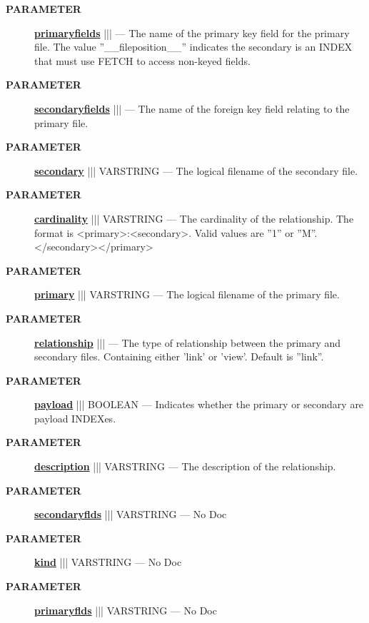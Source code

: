 \par
\begin{description}
\item [\colorbox{tagtype}{\color{white} \textbf{\textsf{PARAMETER}}}] \textbf{\underline{primaryfields}} |||  --- The name of the primary key field for the primary file. The value ''\_\_fileposition\_\_'' indicates the secondary is an INDEX that must use FETCH to access non-keyed fields.
\item [\colorbox{tagtype}{\color{white} \textbf{\textsf{PARAMETER}}}] \textbf{\underline{secondaryfields}} |||  --- The name of the foreign key field relating to the primary file.
\item [\colorbox{tagtype}{\color{white} \textbf{\textsf{PARAMETER}}}] \textbf{\underline{secondary}} ||| VARSTRING --- The logical filename of the secondary file.
\item [\colorbox{tagtype}{\color{white} \textbf{\textsf{PARAMETER}}}] \textbf{\underline{cardinality}} ||| VARSTRING --- The cardinality of the relationship. The format is <primary>:<secondary>. Valid values are ''1'' or ''M''.</secondary></primary>
\item [\colorbox{tagtype}{\color{white} \textbf{\textsf{PARAMETER}}}] \textbf{\underline{primary}} ||| VARSTRING --- The logical filename of the primary file.
\item [\colorbox{tagtype}{\color{white} \textbf{\textsf{PARAMETER}}}] \textbf{\underline{relationship}} |||  --- The type of relationship between the primary and secondary files. Containing either 'link' or 'view'. Default is ''link''.
\item [\colorbox{tagtype}{\color{white} \textbf{\textsf{PARAMETER}}}] \textbf{\underline{payload}} ||| BOOLEAN --- Indicates whether the primary or secondary are payload INDEXes.
\item [\colorbox{tagtype}{\color{white} \textbf{\textsf{PARAMETER}}}] \textbf{\underline{description}} ||| VARSTRING --- The description of the relationship.
\item [\colorbox{tagtype}{\color{white} \textbf{\textsf{PARAMETER}}}] \textbf{\underline{secondaryflds}} ||| VARSTRING --- No Doc
\item [\colorbox{tagtype}{\color{white} \textbf{\textsf{PARAMETER}}}] \textbf{\underline{kind}} ||| VARSTRING --- No Doc
\item [\colorbox{tagtype}{\color{white} \textbf{\textsf{PARAMETER}}}] \textbf{\underline{primaryflds}} ||| VARSTRING --- No Doc
\end{description}







